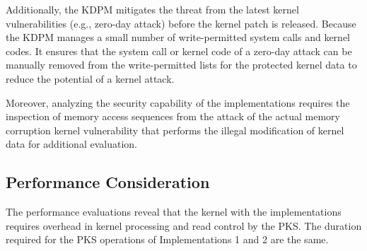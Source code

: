 %
Additionally, the KDPM mitigates the threat from the latest kernel
vulnerabilities (e.g., zero-day attack) before the kernel patch is released.
%
Because the KDPM manages a small number of write-permitted system calls and
kernel codes. It ensures that the system call or kernel code
of a zero-day attack can be manually removed from the write-permitted lists
for the protected kernel data to reduce the potential of a kernel attack.

%  
Moreover, analyzing the security capability of the implementations requires the
inspection of memory access sequences from the attack of the actual memory
corruption kernel vulnerability that performs the illegal modification of kernel
data for additional evaluation.
%
%
%




%

\subsection{Performance Consideration}
The performance evaluations reveal that the kernel with the
implementations requires overhead in kernel processing and read control by the
PKS. The duration required for the PKS operations of Implementations 1 and 2 are
the same.

